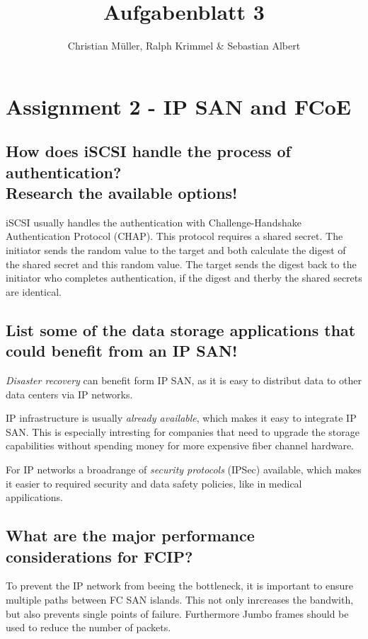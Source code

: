 \documentclass{article}
\title{Aufgabenblatt 3}
\author{Christian Müller, Ralph Krimmel \& Sebastian Albert }
\begin{document}
\maketitle

\section*{Assignment 2 - IP SAN and FCoE}

\subsection{How does iSCSI handle the process of authentication?\\Research the available options!}
	iSCSI usually handles the authentication with Challenge-Handshake Authentication Protocol (CHAP).
	This protocol requires a shared secret.
	The initiator sends the random value to the target 
	and both calculate the digest of the shared secret and this random value.
	The target sends the digest back to the initiator who completes authentication,
	if the digest and therby the shared secrets are identical.

\subsection{List some of the data storage applications that could benefit from an IP SAN!}
	\emph{Disaster recovery} can benefit form IP SAN,
	as it is easy to distribut data to other data centers via IP networks.

	IP infrastructure is usually \emph{already available},
	which makes it easy to integrate IP SAN.
	This is especially intresting for companies that need to upgrade the storage capabilities
	without spending money for more expensive fiber channel hardware.

	For IP networks a broadrange of \emph{security protocols} (IPSec) available,
	which makes it easier to required security and data safety policies,
	like in medical appilications.

\subsection{What are the major performance considerations for FCIP?}
	To prevent the IP network from beeing the bottleneck,
	it is important to ensure multiple paths between FC SAN islands.
	This not only inrcreases the bandwith,
	but also prevents single points of failure.
	Furthermore Jumbo frames should be used to reduce the number of packets.
\end{document}

